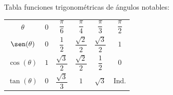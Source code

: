 \documentclass{article}
\begin{document}
{\large Tabla funciones trigonométricas de ángulos notables:}
\begin{center}
  \begin{tabular}{|c||c|c|c|c|c|}
    \hline
    \multirow{2}{*}{$\theta$} & \multirow{2}{*}{$0$} & \multirow{2}{*}{$\dfrac{\pi}{6}$} & \multirow{2}{*}{$\dfrac{\pi}{4}$} & \multirow{2}{*}{$\dfrac{\pi}{3}$} & \multirow{2}{*}{$\dfrac{\pi}{2}$}\\
    & & & & & \\
    \hline
    \hline
    \multirow{3}{*}{$\sen(\theta)$} & \multirow{3}{*}{$0$} & \multirow{3}{*}{$\dfrac{1}{2}$} & \multirow{3}{*}{$\dfrac{\sqrt{2}}{2}$} & \multirow{3}{*}{$\dfrac{\sqrt{3}}{2}$} & \multirow{3}{*}{$1$}\\
    & & & & & \\
    & & & & & \\
    \hline
    \multirow{3}{*}{$\cos(\theta)$} & \multirow{3}{*}{$1$} & \multirow{3}{*}{$\dfrac{\sqrt{3}}{2}$} & \multirow{3}{*}{$\dfrac{\sqrt{2}}{2}$} & \multirow{3}{*}{$\dfrac{1}{2}$} & \multirow{3}{*}{$0$}\\
    & & & & & \\
    & & & & & \\
    \hline
    \multirow{3}{*}{$\tan(\theta)$} & \multirow{3}{*}{$0$} & \multirow{3}{*}{$\dfrac{\sqrt{3}}{3}$} & \multirow{3}{*}{$1$} & \multirow{3}{*}{$\sqrt{3}$} & \multirow{3}{*}{Ind.}\\
    & & & & & \\
    & & & & & \\
    \hline
  \end{tabular}
\end{center}
\end{document}

